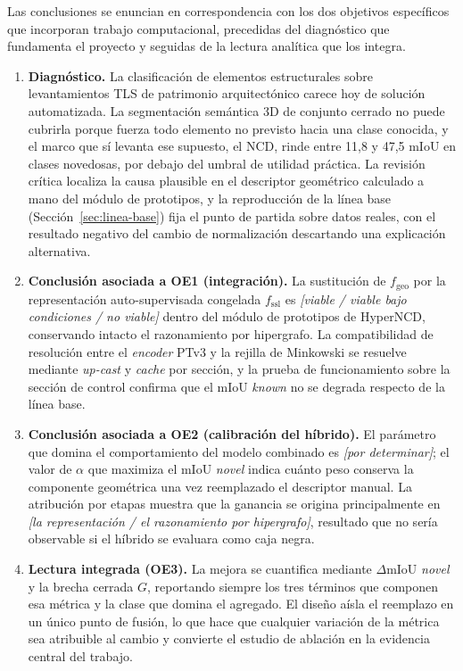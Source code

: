
Las conclusiones se enuncian en correspondencia con los dos objetivos específicos
que incorporan trabajo computacional, precedidas del diagnóstico que fundamenta
el proyecto y seguidas de la lectura analítica que los integra.

\begin{enumerate}
\item \textbf{Diagnóstico.} La clasificación de elementos estructurales sobre
levantamientos TLS de patrimonio arquitectónico carece hoy de solución
automatizada. La segmentación semántica 3D de conjunto cerrado no puede cubrirla
porque fuerza todo elemento no previsto hacia una clase conocida, y el marco que
sí levanta ese supuesto, el NCD, rinde entre 11,8 y 47,5 mIoU en clases
novedosas, por debajo del umbral de utilidad práctica. La revisión crítica
localiza la causa plausible en el descriptor geométrico calculado a mano del
módulo de prototipos, y la reproducción de la línea base
(Sección~\ref{sec:linea-base}) fija el punto de partida sobre datos reales, con
el resultado negativo del cambio de normalización descartando una explicación
alternativa.

\item \textbf{Conclusión asociada a OE1 (integración).} La sustitución de
$f_{\mathrm{geo}}$ por la representación auto-supervisada congelada
$f_{\mathrm{ssl}}$ es \emph{[viable / viable bajo condiciones / no viable]}
dentro del módulo de prototipos de HyperNCD, conservando intacto el razonamiento
por hipergrafo. La compatibilidad de resolución entre el \emph{encoder} PTv3 y la
rejilla de Minkowski se resuelve mediante \emph{up-cast} y \emph{cache} por
sección, y la prueba de funcionamiento sobre la sección de control confirma que
el mIoU \emph{known} no se degrada respecto de la línea base.

\item \textbf{Conclusión asociada a OE2 (calibración del híbrido).} El parámetro
que domina el comportamiento del modelo combinado es \emph{[por determinar]}; el
valor de $\alpha$ que maximiza el mIoU \emph{novel} indica cuánto peso conserva
la componente geométrica una vez reemplazado el descriptor manual. La atribución
por etapas muestra que la ganancia se origina principalmente en \emph{[la
representación / el razonamiento por hipergrafo]}, resultado que no sería
observable si el híbrido se evaluara como caja negra.

\item \textbf{Lectura integrada (OE3).} La mejora se cuantifica mediante
$\Delta$mIoU \emph{novel} y la brecha cerrada $G$, reportando siempre los tres
términos que componen esa métrica y la clase que domina el agregado. El diseño
aísla el reemplazo en un único punto de fusión, lo que hace que cualquier
variación de la métrica sea atribuible al cambio y convierte el estudio de
ablación en la evidencia central del trabajo.


\end{enumerate}
